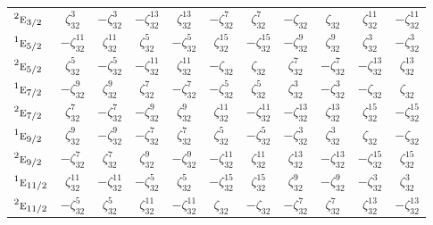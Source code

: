 \documentclass[10pt,a4paper]{article}
\numberwithin{equation}{section}
\newcommand{\irr}[1]{\text{\normalfont\scshape #1}}
\newcommand{\conjpair}[1]{{}^{#1}}
\newcommand{\rootunity}[1]{\zeta_{#1}}
\begin{document}
{\begin{longtable}{@{}lcccccccccc@{}}
$\conjpair{2}\irr{e}_{3/2}$ & $\rootunity{32}^{3}$ & $-\rootunity{32}^{3}$ & $-\rootunity{32}^{13}$ & $\rootunity{32}^{13}$ & $-\rootunity{32}^{7}$ & $\rootunity{32}^{7}$ & $-\rootunity{32}$ & $\rootunity{32}$ & $\rootunity{32}^{11}$ & $-\rootunity{32}^{11}$\\
$\conjpair{1}\irr{e}_{5/2}$ & $-\rootunity{32}^{11}$ & $\rootunity{32}^{11}$ & $\rootunity{32}^{5}$ & $-\rootunity{32}^{5}$ & $\rootunity{32}^{15}$ & $-\rootunity{32}^{15}$ & $-\rootunity{32}^{9}$ & $\rootunity{32}^{9}$ & $\rootunity{32}^{3}$ & $-\rootunity{32}^{3}$\\
$\conjpair{2}\irr{e}_{5/2}$ & $\rootunity{32}^{5}$ & $-\rootunity{32}^{5}$ & $-\rootunity{32}^{11}$ & $\rootunity{32}^{11}$ & $-\rootunity{32}$ & $\rootunity{32}$ & $\rootunity{32}^{7}$ & $-\rootunity{32}^{7}$ & $-\rootunity{32}^{13}$ & $\rootunity{32}^{13}$\\
$\conjpair{1}\irr{e}_{7/2}$ & $-\rootunity{32}^{9}$ & $\rootunity{32}^{9}$ & $\rootunity{32}^{7}$ & $-\rootunity{32}^{7}$ & $-\rootunity{32}^{5}$ & $\rootunity{32}^{5}$ & $\rootunity{32}^{3}$ & $-\rootunity{32}^{3}$ & $-\rootunity{32}$ & $\rootunity{32}$\\
$\conjpair{2}\irr{e}_{7/2}$ & $\rootunity{32}^{7}$ & $-\rootunity{32}^{7}$ & $-\rootunity{32}^{9}$ & $\rootunity{32}^{9}$ & $\rootunity{32}^{11}$ & $-\rootunity{32}^{11}$ & $-\rootunity{32}^{13}$ & $\rootunity{32}^{13}$ & $\rootunity{32}^{15}$ & $-\rootunity{32}^{15}$\\
$\conjpair{1}\irr{e}_{9/2}$ & $\rootunity{32}^{9}$ & $-\rootunity{32}^{9}$ & $-\rootunity{32}^{7}$ & $\rootunity{32}^{7}$ & $\rootunity{32}^{5}$ & $-\rootunity{32}^{5}$ & $-\rootunity{32}^{3}$ & $\rootunity{32}^{3}$ & $\rootunity{32}$ & $-\rootunity{32}$\\
$\conjpair{2}\irr{e}_{9/2}$ & $-\rootunity{32}^{7}$ & $\rootunity{32}^{7}$ & $\rootunity{32}^{9}$ & $-\rootunity{32}^{9}$ & $-\rootunity{32}^{11}$ & $\rootunity{32}^{11}$ & $\rootunity{32}^{13}$ & $-\rootunity{32}^{13}$ & $-\rootunity{32}^{15}$ & $\rootunity{32}^{15}$\\
$\conjpair{1}\irr{e}_{11/2}$ & $\rootunity{32}^{11}$ & $-\rootunity{32}^{11}$ & $-\rootunity{32}^{5}$ & $\rootunity{32}^{5}$ & $-\rootunity{32}^{15}$ & $\rootunity{32}^{15}$ & $\rootunity{32}^{9}$ & $-\rootunity{32}^{9}$ & $-\rootunity{32}^{3}$ & $\rootunity{32}^{3}$\\
$\conjpair{2}\irr{e}_{11/2}$ & $-\rootunity{32}^{5}$ & $\rootunity{32}^{5}$ & $\rootunity{32}^{11}$ & $-\rootunity{32}^{11}$ & $\rootunity{32}$ & $-\rootunity{32}$ & $-\rootunity{32}^{7}$ & $\rootunity{32}^{7}$ & $\rootunity{32}^{13}$ & $-\rootunity{32}^{13}$\\

\end{longtable}}
\end{document}
